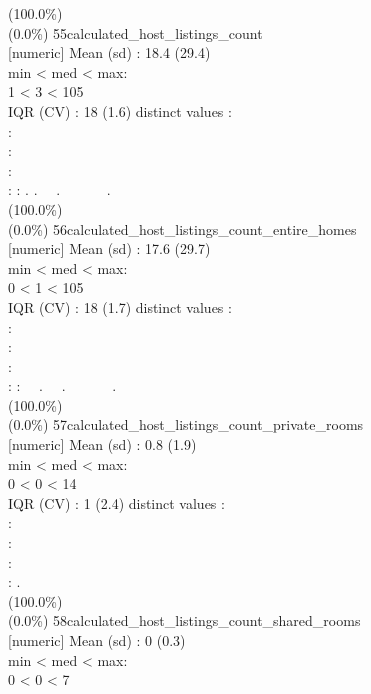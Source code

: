 \documentclass[
  journal,
]{IEEEtran}%
\begin{document}
(100.0\%) \\
(0.0\%) \textbar{} \textbar{}
55\textbar calculated\_host\_listings\_count\\
{[}numeric{]} \textbar Mean (sd) : 18.4 (29.4)\\
min \textless{} med \textless{} max:\\
1 \textless{} 3 \textless{} 105\\
IQR (CV) : 18 (1.6)  distinct values \textbar{} \textbar:\\
:\\
:\\
:\\
: : . . ~~. ~~~~~~. \\
(100.0\%) \\
(0.0\%) \textbar{} \textbar{}
56\textbar calculated\_host\_listings\_count\_entire\_homes\\
{[}numeric{]} \textbar Mean (sd) : 17.6 (29.7)\\
min \textless{} med \textless{} max:\\
0 \textless{} 1 \textless{} 105\\
IQR (CV) : 18 (1.7)  distinct values \textbar{} \textbar:\\
:\\
:\\
:\\
: : ~~. ~~. ~~~~~~. \\
(100.0\%) \\
(0.0\%) \textbar{} \textbar{}
57\textbar calculated\_host\_listings\_count\_private\_rooms\\
{[}numeric{]} \textbar Mean (sd) : 0.8 (1.9)\\
min \textless{} med \textless{} max:\\
0 \textless{} 0 \textless{} 14\\
IQR (CV) : 1 (2.4)  distinct values \textbar{} \textbar:\\
:\\
:\\
:\\
: . \\
(100.0\%) \\
(0.0\%) \textbar{} \textbar{}
58\textbar calculated\_host\_listings\_count\_shared\_rooms\\
{[}numeric{]} \textbar Mean (sd) : 0 (0.3)\\
min \textless{} med \textless{} max:\\
0 \textless{} 0 \textless{} 7\\
\end{document}
